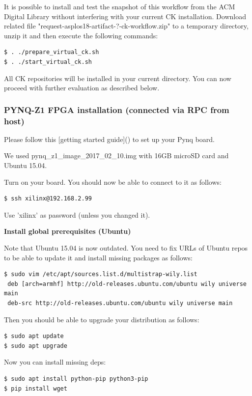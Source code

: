 \documentclass[sigconf]{acmart}
\begin{document}
It is possible to install and test the snapshot of this workflow 
from the ACM Digital Library without interfering with your current CK installation.
Download related file "request-asplos18-artifact-?-ck-workflow.zip"
to a temporary directory, unzip it and then execute the following commands:

\begin{verbatim}
$ . ./prepare_virtual_ck.sh
$ . ./start_virtual_ck.sh
\end{verbatim}

All CK repositories will be installed in your current directory.
You can now proceed with further evaluation as described below.

\subsubsection{PYNQ-Z1 FPGA installation (connected via RPC from host)}

Please follow this [getting started guide]() to set up your Pynq board.

We used pynq\_z1\_image\_2017\_02\_10.img with 16GB microSD card and Ubuntu 15.04.

Turn on your board. You should now be able to connect to it as follows:

\begin{verbatim}
$ ssh xilinx@192.168.2.99
\end{verbatim}

Use 'xilinx' as password (unless you changed it).

\textbf{Install global prerequisites (Ubuntu)}

Note that Ubuntu 15.04 is now outdated. You need to fix URLs of Ubuntu repos to be able to update it and install missing packages as follows:

\begin{verbatim}
$ sudo vim /etc/apt/sources.list.d/multistrap-wily.list
 deb [arch=armhf] http://old-releases.ubuntu.com/ubuntu wily universe main
 deb-src http://old-releases.ubuntu.com/ubuntu wily universe main
\end{verbatim}

Then you should be able to upgrade your distribution as follows:

\begin{verbatim}
$ sudo apt update
$ sudo apt upgrade
\end{verbatim}

Now you can install missing deps:

\begin{verbatim}
$ sudo apt install python-pip python3-pip
$ pip install wget
\end{verbatim}
\end{document}
